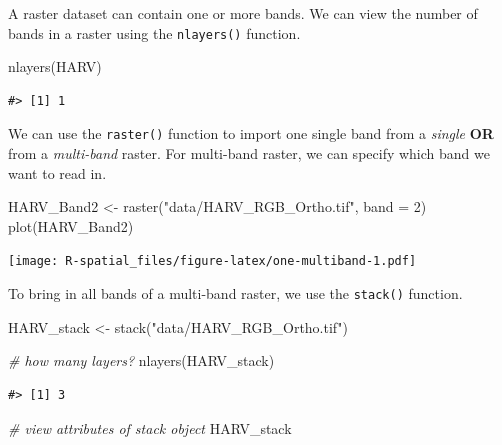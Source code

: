 \documentclass[
  11pt,
]{book}
\newenvironment{Shaded}{\begin{snugshade}}{\end{snugshade}}
\newcommand{\AttributeTok}[1]{\textcolor[rgb]{0.77,0.63,0.00}{#1}}
\newcommand{\CommentTok}[1]{\textcolor[rgb]{0.56,0.35,0.01}{\textit{#1}}}
\newcommand{\DecValTok}[1]{\textcolor[rgb]{0.00,0.00,0.81}{#1}}
\newcommand{\FunctionTok}[1]{\textcolor[rgb]{0.00,0.00,0.00}{#1}}
\newcommand{\NormalTok}[1]{#1}
\newcommand{\OtherTok}[1]{\textcolor[rgb]{0.56,0.35,0.01}{#1}}
\newcommand{\StringTok}[1]{\textcolor[rgb]{0.31,0.60,0.02}{#1}}
\begin{document}
A raster dataset can contain one or more bands. We can view the number of bands in a raster using the \texttt{nlayers()} function.

\begin{Shaded}
\begin{Highlighting}[]
\FunctionTok{nlayers}\NormalTok{(HARV)}
\end{Highlighting}
\end{Shaded}

\begin{verbatim}
#> [1] 1
\end{verbatim}

We can use the \texttt{raster()} function to import one single band from a \emph{single} \textbf{OR} from a \emph{multi-band} raster. For multi-band raster, we can specify which band we want to read in.

\begin{Shaded}
\begin{Highlighting}[]
\NormalTok{HARV\_Band2 }\OtherTok{\textless{}{-}} \FunctionTok{raster}\NormalTok{(}\StringTok{"data/HARV\_RGB\_Ortho.tif"}\NormalTok{, }\AttributeTok{band =} \DecValTok{2}\NormalTok{)}
\FunctionTok{plot}\NormalTok{(HARV\_Band2)}
\end{Highlighting}
\end{Shaded}

\texttt{[image: R-spatial\_files/figure-latex/one-multiband-1.pdf]}

To bring in all bands of a multi-band raster, we use the \texttt{stack()} function.

\begin{Shaded}
\begin{Highlighting}[]
\NormalTok{HARV\_stack }\OtherTok{\textless{}{-}} \FunctionTok{stack}\NormalTok{(}\StringTok{"data/HARV\_RGB\_Ortho.tif"}\NormalTok{)}

\CommentTok{\# how many layers?}
\FunctionTok{nlayers}\NormalTok{(HARV\_stack)}
\end{Highlighting}
\end{Shaded}

\begin{verbatim}
#> [1] 3
\end{verbatim}

\begin{Shaded}
\begin{Highlighting}[]
\CommentTok{\# view attributes of stack object}
\NormalTok{HARV\_stack}
\end{Highlighting}
\end{Shaded}
\end{document}
